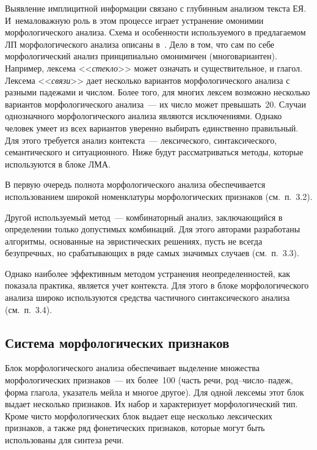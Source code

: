 \begin{multicols}{2}
     Выявление имплицитной информации связано с глубинным анализом 
текста ЕЯ. И~немаловажную роль в этом процессе играет устранение 
омонимии морфологического анализа. Схема и особенности используемого в 
предлагаемом ЛП морфологического анализа описаны в~\cite{15kuz, 16kuz}. 
Дело в том, что сам по себе морфологический анализ принципиально 
омонимичен (многовариантен). Например, лексема <<\textit{стекло}>> может 
означать и существительное, и глагол. Лексема <<\textit{связи}>> дает 
несколько вариантов морфологического анализа с разными падежами и числом. 
Более того, для многих лексем возможно несколько вариантов 
морфологического анализа~--- их чис\-ло может превышать~20. Случаи 
однозначного морфологического анализа являются исключениями. Однако 
человек умеет из всех вариантов уверенно выбирать единственно правильный. 
Для этого требуется анализ контекста~--- лексического, синтаксического, 
семантического и ситуационного. Ниже будут рассматриваться методы, 
которые используются в блоке ЛМА. 
     
     В первую очередь полнота морфологического анализа обеспечивается 
использованием широкой номенклатуры морфологических признаков 
(см.\ п.~3.2).
     
     Другой используемый метод~--- комбинаторный анализ, заключающийся 
в определении только допустимых комбинаций. Для этого авторами 
разработаны алгоритмы, основанные на эвристических решениях, пусть не 
всегда безупречных, но срабатывающих в ряде самых значимых случаев 
(см.\ п.~3.3).

Однако наиболее эффективным методом устра\-не\-ния неопределенностей, как 
показала \mbox{практика}, является учет контекста. Для этого в блоке 
морфологического анализа широко используются средства частичного 
синтаксического анализа (см.\ п.~3.4).


\subsection{Система морфологических признаков}
     
     Блок морфологического анализа обеспечивает выделение множества 
морфологических признаков~--- их более~100 (часть речи, род--чис\-ло--па\-деж, 
форма глагола, указатель мейла и многое другое). Для одной лексемы этот блок 
выдает несколько признаков. Их набор и характеризует морфологический тип. 
Кроме чисто морфологических блок выдает еще несколько лексических 
признаков, а также ряд фонетических признаков, которые могут быть 
использованы для синтеза речи.
     

\end{multicols}
